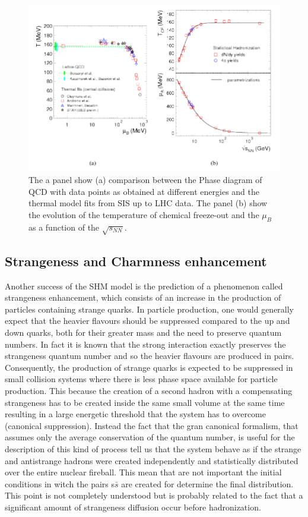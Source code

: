 \documentclass[12pt,a4paper]{book}
\begin{document}
\begin{figure}
		\includegraphics[width=0.8 \linewidth]{pictures/shm_qcd_comparison.png}
		\caption{ The a panel show (a) comparison between the Phase diagram of QCD with data points as obtained at different energies and the thermal model fits from SIS up to LHC data. The panel (b) show the evolution of the temperature of chemical freeze-out and the $\mu_B$ as a function of the $\sqrt{s_{NN}}$.\cite{Andronic_2017}}
		\label{fig:shm_qcd_comparison}
		
	\end{figure}
	
	\subsection{Strangeness and Charmness enhancement}
	Another success of the SHM model is the prediction of a phenomenon called strangeness enhancement, which consists of an increase in the production of particles containing strange quarks.
	In particle production, one would generally expect that the heavier flavours should be suppressed compared to the up and down quarks, both for their greater mass and the need to preserve quantum numbers. In fact it is known that the strong interaction exactly preserves the strangeness quantum number and so the heavier flavours are produced in pairs. Consequently, the production of strange quarks is expected to be suppressed in small collision systems where there is less phase space available for particle production. This because the creation of a second hadron with a compensating strangeness has to be created inside the same small volume at the same time resulting in a large energetic threshold that the system has to overcome (canonical suppression). Instead the fact that the gran canonical formalism, that assumes only the average conservation of the quantum number, is useful for the description of this kind of process tell us that the system behave as if the strange and antistrange hadrons were created independently and statistically distributed over the entire nuclear fireball. This mean that are not important the initial conditions in witch the pairs s$\bar{s}$ are created for determine the final distribution. This point is not completely understood but is probably related to the fact that a significant amount of strangeness diffusion occur before hadronization.
	
\end{document}

